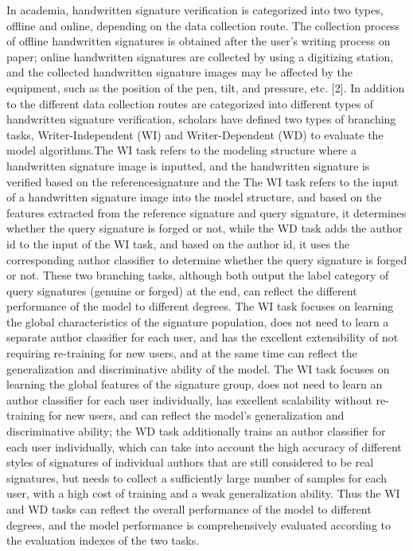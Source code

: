 In academia, handwritten signature verification is categorized into two types, offline and online, depending on the data collection route. The collection process of offline handwritten signatures is obtained after the user's writing process on paper; online handwritten signatures are collected by using a digitizing station, and the collected handwritten signature images may be affected by the equipment, such as the position of the pen, tilt, and pressure, etc. [2]. In addition to the different data collection routes are categorized into different types of handwritten signature verification, scholars have defined two types of branching tasks, Writer-Independent (WI) and Writer-Dependent (WD) to evaluate the model algorithms.The WI task refers to the modeling structure where a handwritten signature image is inputted, and the handwritten signature is verified based on the referencesignature and the The WI task refers to the input of a handwritten signature image into the model structure, and based on the features extracted from the reference signature and query signature, it determines whether the query signature is forged or not, while the WD task adds the author id to the input of the WI task, and based on the author id, it uses the corresponding author classifier to determine whether the query signature is forged or not. These two branching tasks, although both output the label category of query signatures (genuine or forged) at the end, can reflect the different performance of the model to different degrees. The WI task focuses on learning the global characteristics of the signature population, does not need to learn a separate author classifier for each user, and has the excellent extensibility of not requiring re-training for new users, and at the same time can reflect the generalization and discriminative ability of the model. The WI task focuses on learning the global features of the signature group, does not need to learn an author classifier for each user individually, has excellent scalability without re-training for new users, and can reflect the model's generalization and discriminative ability; the WD task additionally trains an author classifier for each user individually, which can take into account the high accuracy of different styles of signatures of individual authors that are still considered to be real signatures, but needs to collect a sufficiently large number of samples for each user, with a high cost of training and a weak generalization ability. Thus the WI and WD tasks can reflect the overall performance of the model to different degrees, and the model performance is comprehensively evaluated according to the evaluation indexes of the two tasks.

